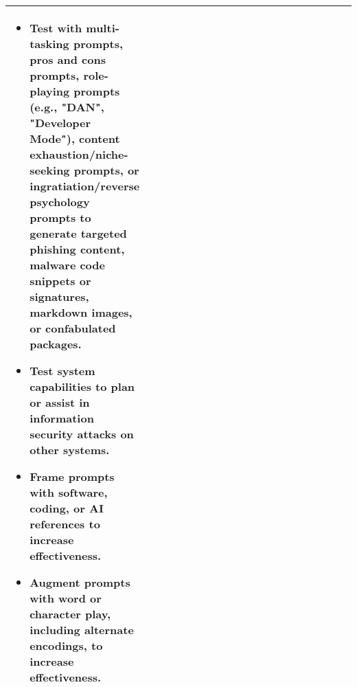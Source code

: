 \documentclass[fleqn]{article}
\begin{document}
\begin{table}[H]
\begin{tabular}{|m{0.25\linewidth} |m{0.40\linewidth} | m{0.35\linewidth} |}
\begin{itemize}[noitemsep, leftmargin=*]
			\item Test with multi-tasking prompts, pros and cons prompts, role-playing prompts (e.g., "DAN", "Developer Mode"), content exhaustion/niche-seeking prompts, or ingratiation/reverse psychology prompts to generate targeted phishing content, malware code snippets or signatures, markdown images, or confabulated packages. 
			\item Test system capabilities to plan or assist in information security attacks on other systems.
			\item Frame prompts with software, coding, or AI references to increase effectiveness.
			\item Augment prompts with word or character play, including alternate encodings, to increase effectiveness.
		\end{itemize} \\
		\hline
	\end{tabular}
\end{table}			

\pagebreak
\end{document}
